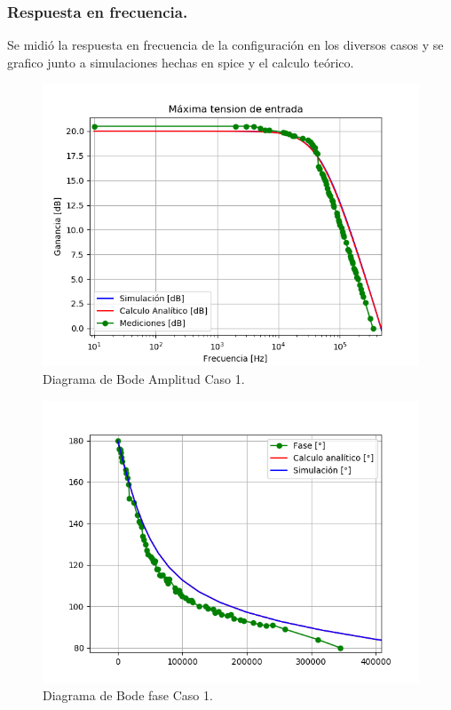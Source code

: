 \subsubsection{Respuesta en frecuencia.}
Se midió la respuesta en frecuencia de la configuración en los diversos casos y se grafico junto a simulaciones hechas en spice y el calculo teórico.
\begin{figure}[H]	
	\centering
	\includegraphics[width=\textwidth]{Ejercicio1/Imagenes/BodeC1.png}
	\caption{Diagrama de Bode Amplitud Caso 1.}
	\label{fig:BodeC1}
\end{figure} 
\begin{figure}[H]	
	\centering
	\includegraphics[width=\textwidth]{Ejercicio1/Imagenes/BodephC1.png}
	\caption{Diagrama de Bode fase Caso 1.}
	\label{fig:BodephC1}
\end{figure} 
